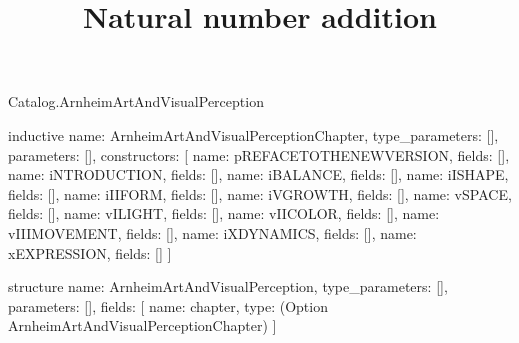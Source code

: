 \begin{lexlean}{Catalog.ArnheimArtAndVisualPerception}
\title{Natural number addition}
\begin{semanticmodule}
inductive{
  name: ArnheimArtAndVisualPerceptionChapter,
  type_parameters: [],
  parameters: [],
  constructors: [
    {name: pREFACETOTHENEWVERSION, fields: []},
    {name: iNTRODUCTION, fields: []},
    {name: iBALANCE, fields: []},
    {name: iISHAPE, fields: []},
    {name: iIIFORM, fields: []},
    {name: iVGROWTH, fields: []},
    {name: vSPACE, fields: []},
    {name: vILIGHT, fields: []},
    {name: vIICOLOR, fields: []},
    {name: vIIIMOVEMENT, fields: []},
    {name: iXDYNAMICS, fields: []},
    {name: xEXPRESSION, fields: []}
  ]
}

structure{
  name: ArnheimArtAndVisualPerception,
  type_parameters: [],
  parameters: [],
  fields: [
    {name: chapter, type: (Option ArnheimArtAndVisualPerceptionChapter)}
  ]
}
\end{semanticmodule}
\end{lexlean}

